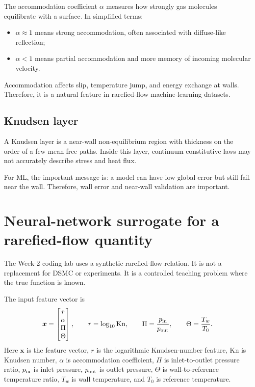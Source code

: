 \documentclass[11pt]{article}
\newcommand{\kn}{\mathrm{Kn}}
\newcommand{\bx}{\bm{x}}
\begin{document}
The accommodation coefficient $\alpha$ measures how strongly gas molecules equilibrate with a surface.  In simplified terms:
\begin{itemize}
    \item $\alpha\approx1$ means strong accommodation, often associated with diffuse-like reflection;
    \item $\alpha<1$ means partial accommodation and more memory of incoming molecular velocity.
\end{itemize}

Accommodation affects slip, temperature jump, and energy exchange at walls.  Therefore, it is a natural feature in rarefied-flow machine-learning datasets.

\subsection{Knudsen layer}

A Knudsen layer is a near-wall non-equilibrium region with thickness on the order of a few mean free paths.  Inside this layer, continuum constitutive laws may not accurately describe stress and heat flux.

For ML, the important message is: a model can have low global error but still fail near the wall.  Therefore, wall error and near-wall validation are important.

\section{Neural-network surrogate for a rarefied-flow quantity}

The Week-2 coding lab uses a synthetic rarefied-flow relation.  It is not a replacement for DSMC or experiments.  It is a controlled teaching problem where the true function is known.

The input feature vector is
\begin{equation}
    \bx = \begin{bmatrix} r \\ \alpha \\ \Pi \\ \Theta \end{bmatrix},
    \qquad r=\log_{10}\kn, \qquad \Pi=\frac{p_{\rm in}}{p_{\rm out}}, \qquad \Theta=\frac{T_w}{T_0}.
    \label{eq:lab_features}
\end{equation}
Here $\bx$ is the feature vector, $r$ is the logarithmic Knudsen-number feature, $\kn$ is Knudsen number, $\alpha$ is accommodation coefficient, $\Pi$ is inlet-to-outlet pressure ratio, $p_{\rm in}$ is inlet pressure, $p_{\rm out}$ is outlet pressure, $\Theta$ is wall-to-reference temperature ratio, $T_w$ is wall temperature, and $T_0$ is reference temperature.
\end{document}
